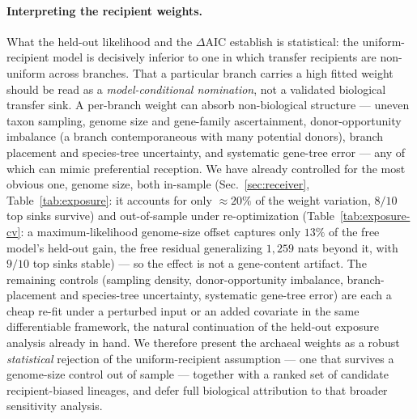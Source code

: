 \documentclass[11pt]{article}
\begin{document}
\paragraph{Interpreting the recipient weights.} What the held-out likelihood and the
$\Delta$AIC establish is statistical: the uniform-recipient model is decisively
inferior to one in which transfer recipients are non-uniform across branches. That a
particular branch carries a high fitted weight should be read as a \emph{model-conditional
nomination}, not a validated biological transfer sink. A per-branch weight can absorb
non-biological structure --- uneven taxon sampling, genome size and gene-family
ascertainment, donor-opportunity imbalance (a branch contemporaneous with many potential
donors), branch placement and species-tree uncertainty, and systematic gene-tree error
--- any of which can mimic preferential reception. We have already controlled for the most
obvious one, genome size, both in-sample (Sec.~\ref{sec:receiver}, Table~\ref{tab:exposure}:
it accounts for only $\approx\!20\%$ of the weight variation, $8/10$ top sinks survive) and
out-of-sample under re-optimization (Table~\ref{tab:exposure-cv}: a maximum-likelihood
genome-size offset captures only $13\%$ of the free model's held-out gain, the free residual
generalizing $1{,}259$ nats beyond it, with $9/10$ top sinks stable) --- so the effect is not a
gene-content artifact. The remaining controls (sampling density, donor-opportunity imbalance,
branch-placement and species-tree uncertainty, systematic gene-tree error) are each a cheap
re-fit under a perturbed input or an added covariate in the same differentiable framework, the
natural continuation of the held-out exposure analysis already in hand. We therefore present
the archaeal weights as a robust \emph{statistical} rejection of the uniform-recipient
assumption --- one that survives a genome-size control out of sample --- together with a ranked
set of candidate recipient-biased lineages, and defer full biological attribution to that
broader sensitivity analysis.
\end{document}
